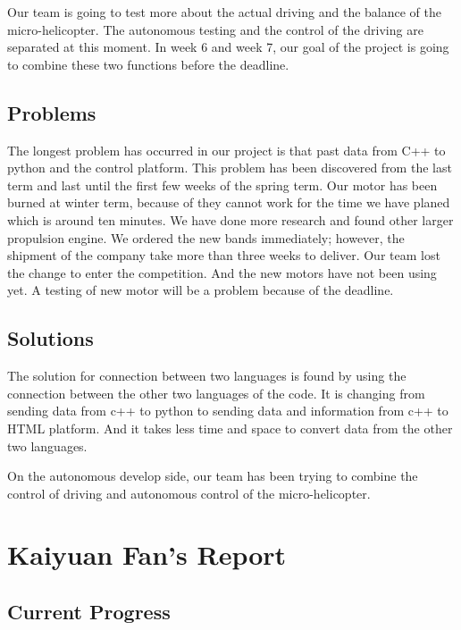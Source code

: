 \documentclass[onecolumn, draftclsnofoot,10pt, compsoc]{IEEEtran}
\begin{document}
Our team is going to test more about the actual driving and the balance of the micro-helicopter. The autonomous testing and the control of the driving are separated at this moment. In week 6 and week 7, our goal of the project is going to combine these two functions before the deadline.

\subsection{Problems}

The longest problem has occurred in our project is that past data from C++ to python and the control platform. This problem has been discovered from the last term and last until the first few weeks of the spring term. Our motor has been burned at winter term, because of they cannot work for the time we have planed which is around ten minutes. We have done more research and found other larger propulsion engine. We ordered the new bands immediately; however, the shipment of the company take more than three weeks to deliver. Our team lost the change to enter the competition. And the new motors have not been using yet. A testing of new motor will be a problem because of the deadline.

\subsection{Solutions}

The solution for connection between two languages is found by using the connection between the other two languages of the code. It is changing from sending data from c++ to python to sending data and information from c++ to HTML platform. And it takes less time and space to convert data from the other two languages.

On the autonomous develop side, our team has been trying to combine the control of driving and autonomous control of the micro-helicopter. 




\section{Kaiyuan Fan's Report}

\subsection{Current Progress}
\end{document}
